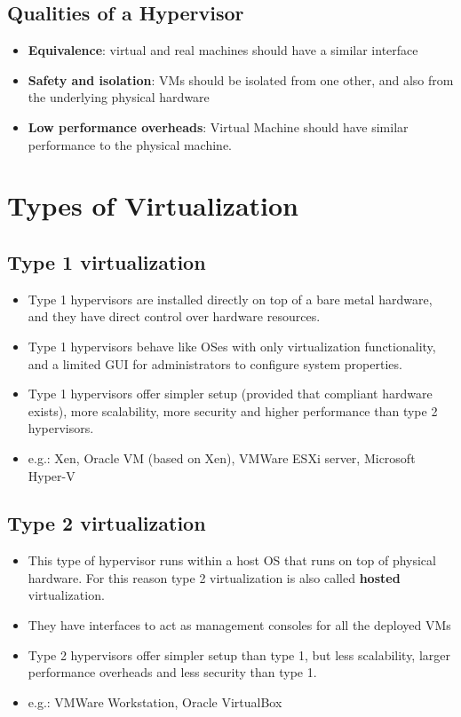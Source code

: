 \documentclass{article}
\begin{document}
\subsection{Qualities of a Hypervisor}
\begin{itemize}
    \item \textbf{Equivalence}: virtual and real machines should have a similar interface
    
    \item \textbf{Safety and isolation}: VMs should be isolated from one other, and also from the underlying physical hardware
    
    \item \textbf{Low performance overheads}: Virtual Machine should have similar performance to the physical machine. 
\end{itemize}

\section{Types of Virtualization}
\subsection{Type 1 virtualization}
\begin{itemize}
    \item Type 1 hypervisors are installed directly on top of a bare metal hardware, and they have direct control over hardware resources. 
    
    \item Type 1 hypervisors behave like OSes with only virtualization functionality, and a limited GUI for administrators to configure system properties.
    
    \item Type 1 hypervisors offer simpler setup (provided that compliant hardware exists), more scalability, more security and higher performance than type 2 hypervisors.
    
    \item e.g.: Xen, Oracle VM (based on Xen), VMWare ESXi server, Microsoft Hyper-V
\end{itemize}

\subsection{Type 2 virtualization}
\begin{itemize}
    \item This type of hypervisor runs within a host OS that runs on top of physical hardware. For this reason type 2 virtualization is also called \textbf{hosted} virtualization. 
    
    \item They have interfaces to act as management consoles for all the deployed VMs
    
    \item Type 2 hypervisors offer simpler setup than type 1, but less scalability, larger performance overheads and less security than type 1.
    
    \item e.g.: VMWare Workstation, Oracle VirtualBox
\end{itemize}
\end{document}

